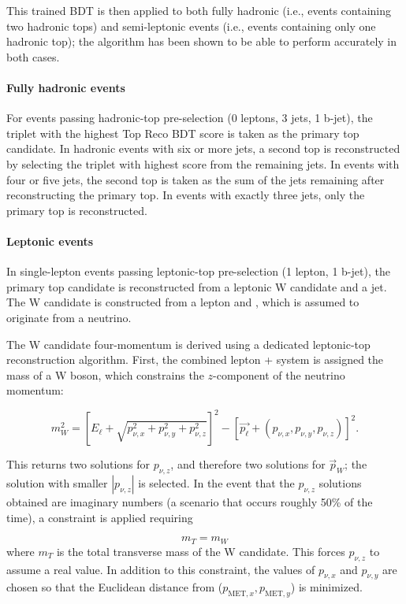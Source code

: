 This trained BDT is then applied to both fully hadronic (i.e., events containing two hadronic tops) and semi-leptonic events (i.e., events containing only one hadronic top); the algorithm has been shown to be able to perform accurately in both cases.


\paragraph{Fully hadronic events}
For events passing hadronic-top pre-selection (0 leptons, 3 jets, 1 b-jet), the triplet with the highest Top Reco BDT score is taken as the primary top candidate. In hadronic events with six or more jets, a second top is reconstructed by selecting the triplet with highest score from the remaining jets. In events with four or five jets, the second top is taken as the sum of the jets remaining after reconstructing the primary top. In events with exactly three jets, only the primary top is reconstructed.


\paragraph{Leptonic events}
In single-lepton events passing leptonic-top pre-selection (1 lepton, 1 b-jet), the primary top candidate is reconstructed from a leptonic W candidate and a jet. The W candidate is constructed from a lepton and \MET, which is assumed to originate from a neutrino.


The W candidate four-momentum is derived using a dedicated leptonic-top reconstruction algorithm. First, the combined lepton + \MET system is assigned the mass of a W boson, which constrains the $z$-component of the neutrino momentum:

\begin{equation}
m_W^2 = \left[E_\ell + \sqrt{p_{\nu,x}^2 + p_{\nu,y}^2 + p_{\nu,z}^2}\right]^2 - \left[\vec{p_\ell} + (p_{\nu,x},p_{\nu,y},p_{\nu,z})\right]^2.
\end{equation}

This returns two solutions for $p_{\nu,z}$, and therefore two solutions for $\vec{p}_{W}$; the solution with smaller $|p_{\nu,z}|$ is selected. In the event that the $p_{\nu,z}$ solutions obtained are imaginary numbers (a scenario that occurs roughly 50\% of the time), a constraint is applied requiring

\begin{equation}
m_{T} = m_{W}
\end{equation}
where $m_{T}$ is the total transverse mass of the W candidate. This forces $p_{\nu,z}$ to assume a real value. In addition to this constraint, the values of $p_{\nu,x}$ and  $p_{\nu,y}$ are chosen so that the Euclidean distance from ($p_{\text{MET},x},p_{\text{MET},y}$) is minimized.

